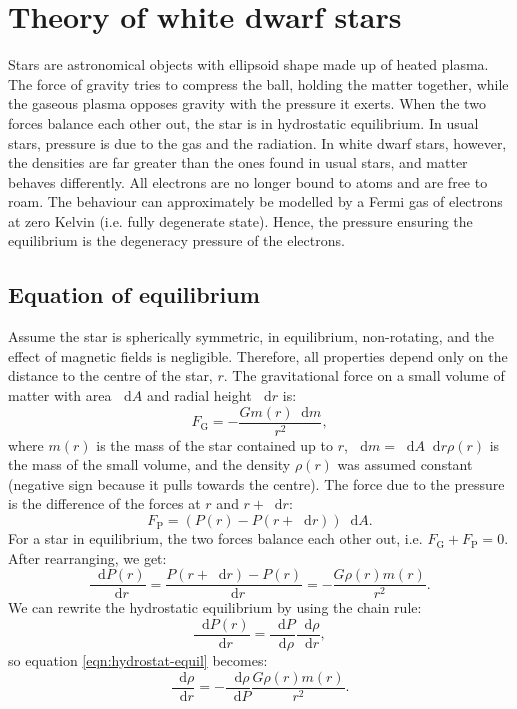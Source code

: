 \documentclass[]{article}
\newcommand{\dd}{\mathop{}\!\mathrm{d}}
\begin{document}
\section{Theory of white dwarf stars}\label{sec:theroy-white-dwarfs}
	Stars are astronomical objects with ellipsoid shape made up of heated plasma. The force of gravity tries to compress the ball, holding the matter together, while the gaseous plasma opposes gravity with the pressure it exerts. When the two forces balance each other out, the star is in hydrostatic equilibrium. In usual stars, pressure is due to the gas and the radiation. In white dwarf stars, however, the densities are far greater than the ones found in usual stars, and matter behaves differently. All electrons are no longer bound to atoms and are free to roam. The behaviour can approximately be modelled by a Fermi gas of electrons at zero Kelvin (i.e. fully degenerate state). Hence, the pressure ensuring the equilibrium is the degeneracy pressure of the electrons.

\subsection{Equation of equilibrium}\label{subsec:test}
	Assume the star is spherically symmetric, in equilibrium, non-rotating, and the effect of magnetic fields is negligible. Therefore, all properties depend only on the distance to the centre of the star, $r$. The gravitational force on a small volume of matter with area $\dd A$ and radial height $\dd r$ is:
	\begin{equation}
		F_\mathrm{G} = - \frac{G m\left(r\right) \dd m}{r^2},
	\end{equation}
	where $m\left(r\right)$ is the mass of the star contained up to $r$, $\dd m = \dd A \dd r \rho \left(r\right)$ is the mass of the small volume, and the density $\rho \left(r\right)$ was assumed constant (negative sign because it pulls towards the centre). The force due to the pressure is the difference of the forces at $r$ and $r + \dd r$:
	\begin{equation}
	F_\mathrm{P} = \left( P\left(r\right) - P\left(r + \dd r\right)\right) \dd A.
	\end{equation}
	For a star in equilibrium, the two forces balance each other out, i.e. $F_\mathrm{G} + F_\mathrm{P} = 0$. After rearranging, we get:
	\begin{equation} \label{eqn:hydrostat-equil}
		\frac{\dd P(r)}{\dd r} = \frac{P\left(r + \dd r\right) - P\left(r\right)}{\dd r} = - \frac{G \rho(r) m(r)}{r^2}.
	\end{equation}
	We can rewrite the hydrostatic equilibrium by using the chain rule:
	\begin{equation}
		\frac{\dd P(r)}{\dd r} = \frac{\dd P}{\dd \rho} \frac{\dd \rho}{\dd r},
	\end{equation}
	so equation \eqref{eqn:hydrostat-equil} becomes:
	\begin{equation}\label{eqn:hydrostat-equil-rhor}
		\frac{\dd \rho}{\dd r} = - \frac{\dd \rho}{\dd P} \frac{G \rho(r) m(r)}{r^2}.
	\end{equation}
\end{document}
